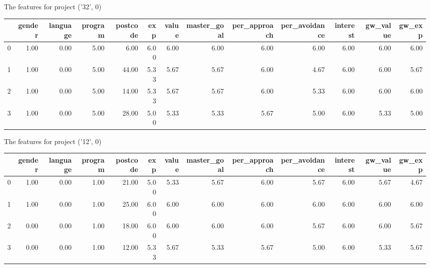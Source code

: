 \documentclass[7pt]{article}
\begin{document}
\begin{landscape}
The features for project ('32', 0)\newline
\begin{tabular}{lrrrrrrrrrrrr}
\toprule
{} &  gender &  language &  program &  postcode &  exp &  value &  master\_goal &  per\_approach &  per\_avoidance &  interest &  gw\_value &  gw\_exp \\
\midrule
0 &    1.00 &      0.00 &     5.00 &      6.00 & 6.00 &   6.00 &         6.00 &          6.00 &           6.00 &      6.00 &             6.00 &           6.00 \\
1 &    1.00 &      0.00 &     5.00 &     44.00 & 5.33 &   5.67 &         5.67 &          6.00 &           4.67 &      6.00 &             6.00 &           5.67 \\
2 &    1.00 &      0.00 &     5.00 &     14.00 & 5.33 &   5.67 &         5.67 &          6.00 &           5.33 &      6.00 &             6.00 &           6.00 \\
3 &    1.00 &      0.00 &     5.00 &     28.00 & 5.00 &   5.33 &         5.33 &          5.67 &           5.00 &      6.00 &             5.33 &           5.00 \\
\bottomrule
\end{tabular}

The features for project ('12', 0)\newline
\begin{tabular}{lrrrrrrrrrrrr}
\toprule
{} &  gender &  language &  program &  postcode &  exp &  value &  master\_goal &  per\_approach &  per\_avoidance &  interest &  gw\_value &  gw\_exp \\
\midrule
0 &    1.00 &      0.00 &     1.00 &     21.00 & 5.00 &   5.33 &         5.67 &          6.00 &           5.67 &      6.00 &             5.67 &           4.67 \\
1 &    1.00 &      0.00 &     1.00 &     25.00 & 6.00 &   6.00 &         6.00 &          6.00 &           6.00 &      6.00 &             6.00 &           6.00 \\
2 &    0.00 &      0.00 &     1.00 &     18.00 & 6.00 &   6.00 &         6.00 &          6.00 &           5.67 &      6.00 &             6.00 &           5.67 \\
3 &    0.00 &      0.00 &     1.00 &     12.00 & 5.33 &   5.67 &         5.33 &          5.67 &           5.00 &      6.00 &             5.33 &           5.67 \\
\bottomrule
\end{tabular}


\end{landscape}
\end{document}
